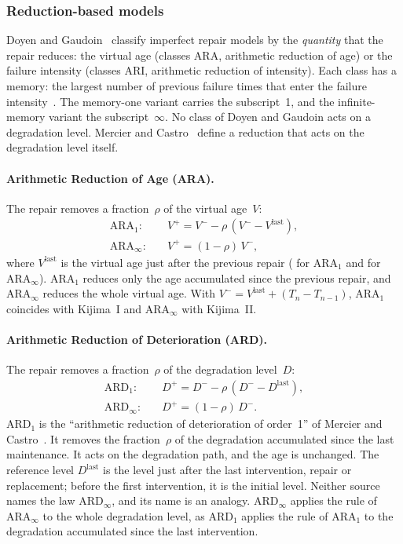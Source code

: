 \documentclass[11pt,a4paper]{article}
\theoremstyle{plain}
\theoremstyle{definition}
\theoremstyle{remark}
\begin{document}
\subsubsection{Reduction-based models}

Doyen and Gaudoin~\cite{DoyenGaudoin2004} classify imperfect repair models by the \emph{quantity} that the repair reduces: the virtual age (classes ARA, arithmetic reduction of age) or the failure intensity (classes ARI, arithmetic reduction of intensity).
Each class has a memory: the largest number of previous failure times that enter the failure intensity~\cite[p.~8]{DoyenGaudoin2004}.
The memory-one variant carries the subscript~1, and the infinite-memory variant the subscript~$\infty$.
No class of Doyen and Gaudoin acts on a degradation level.
Mercier and Castro~\cite{MercierCastro2019} define a reduction that acts on the degradation level itself.

\paragraph{Arithmetic Reduction of Age (ARA).}
The repair removes a fraction~$\rho$ of the virtual age~$V$:
\begin{align}
  \text{ARA}_1: &\quad V^+ = V^- - \rho\,(V^- - V^{\mathrm{last}}), \label{eq:ara1} \\
  \text{ARA}_\infty: &\quad V^+ = (1-\rho)\,V^-, \label{eq:arainf}
\end{align}
where $V^{\mathrm{last}}$ is the virtual age just after the previous repair (\cite[eq.~(22), p.~12]{DoyenGaudoin2004} for $\text{ARA}_1$ and \cite[eq.~(20), p.~11]{DoyenGaudoin2004} for $\text{ARA}_\infty$).
$\text{ARA}_1$ reduces only the age accumulated since the previous repair, and $\text{ARA}_\infty$ reduces the whole virtual age.
With $V^- = V^{\mathrm{last}} + (T_n - T_{n-1})$, $\text{ARA}_1$ coincides with Kijima~I and $\text{ARA}_\infty$ with Kijima~II.

\paragraph{Arithmetic Reduction of Deterioration (ARD).}
The repair removes a fraction~$\rho$ of the degradation level~$D$:
\begin{align}
  \text{ARD}_1: &\quad D^+ = D^- - \rho\,(D^- - D^{\mathrm{last}}), \label{eq:ard1} \\
  \text{ARD}_\infty: &\quad D^+ = (1-\rho)\,D^-. \label{eq:ardinf}
\end{align}
$\text{ARD}_1$ is the ``arithmetic reduction of deterioration of order~1'' of Mercier and Castro~\cite[\S3.1, eq.~(4)]{MercierCastro2019}.
It removes the fraction~$\rho$ of the degradation accumulated since the last maintenance.
It acts on the degradation path, and the age is unchanged.
The reference level $D^{\mathrm{last}}$ is the level just after the last intervention, repair or replacement; before the first intervention, it is the initial level.
Neither source names the law $\text{ARD}_\infty$, and its name is an analogy.
$\text{ARD}_\infty$ applies the rule of $\text{ARA}_\infty$ to the whole degradation level, as $\text{ARD}_1$ applies the rule of $\text{ARA}_1$ to the degradation accumulated since the last intervention.
\end{document}
